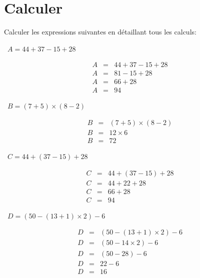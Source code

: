 	
	\section{Calculer}
	Calculer les expressions suivantes en détaillant tous les calculs:
	\begin{questions}
		
		\question[3]  $A =  44 + 37 - 15 + 28$
		
		\fillwithdottedlines{6cm}
		{\LARGE \begin{solution}
			\begin{eqnarray*}
				A &=& 44 + 37 - 15 + 28 \\
				A &=& 81 - 15 + 28 \\
				A &=& 66 + 28 \\
				A &=& 94
			\end{eqnarray*}
		\end{solution}}
		
		
		\question[3]  $B = (7 + 5) \times (8 - 2)$
		
		\fillwithdottedlines{6cm}
		{\LARGE \begin{solution}
			\begin{eqnarray*}
			B &=& (7 + 5) \times (8 - 2)\\
			B &=& 12 \times 6 \\			
			B &=& 72
			\end{eqnarray*}
		\end{solution}}
		
		\newpage
		\question[4]  $C =  44 + (37 - 15) + 28$
		
		\fillwithdottedlines{5cm}
		{\LARGE \begin{solution}
			\begin{eqnarray*}
			C &=&  44 + (37 - 15) + 28\\
			C &=&  44 + 22 + 28\\
			C &=& 66 + 28\\
			C &=& 94
			\end{eqnarray*}
		\end{solution}}
		
		 \question[4]  $D = (50 - (13 + 1) \times 2) - 6$
		
		\fillwithdottedlines{5cm}
		{\LARGE 
			\begin{solution}
			\begin{eqnarray*}
			D &=&  (50 - (13 + 1) \times 2) - 6\\
			D &=&  (50 - 14 \times 2) - 6\\
			D &=& (50 - 28) - 6\\
			D &=& 22 - 6 \\
			D &=& 16 
			\end{eqnarray*}
		\end{solution}}
		

\end{questions}
